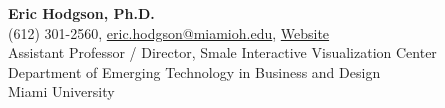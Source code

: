 \textbf{Eric Hodgson, Ph.D.}\\
\hspace*{0.25cm}\faPhone\hspace*{0.1cm}(612) 301-2560,\hspace*{0.2cm} \faEnvelopeO\hspace*{0.1cm}\href{mailto://eric.hodgson@miamioh.edu}{eric.hodgson@miamioh.edu}, \faLink\hspace*{0.1cm}\href{https://www.miamioh.edu/cca/academics/departments/etbd/about/our-people/faculty/eric-hodgson/index.html}{Website}\\
\hspace*{0.25cm} Assistant Professor / Director, Smale Interactive Visualization Center\\
\hspace*{0.25cm} Department of Emerging Technology in Business and Design\\
\hspace*{0.25cm} Miami University\\




\label{references_last}
